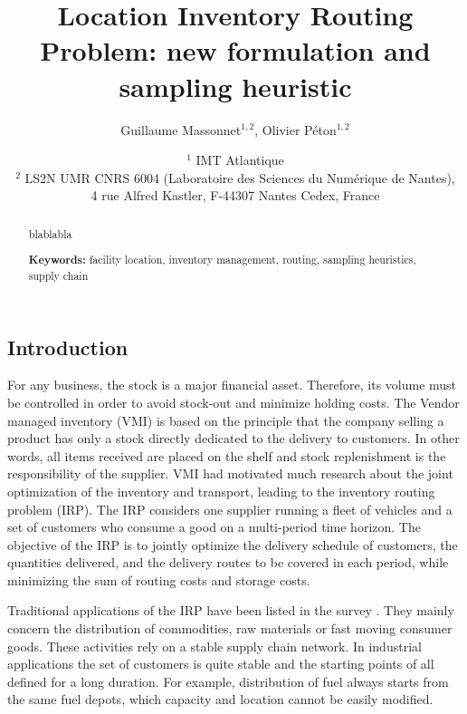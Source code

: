 \documentclass[a4paper,10pt]{article}
\title{Location Inventory Routing Problem: new formulation and sampling heuristic}
\author{Guillaume Massonnet$^{1,2}$, Olivier P\'eton$^{1,2}$}
\date{$^1$ IMT Atlantique\\ 
	$^2$ LS2N UMR CNRS 6004 (Laboratoire des Sciences du Numérique de Nantes), \\ 4 rue Alfred Kastler, F-44307 Nantes Cedex, France}
\begin{document}
	
\maketitle

\begin{abstract}
	blablabla
	
	
\textbf{Keywords:}	facility location, inventory management, routing, sampling heuristics, supply chain
	
\end{abstract}



\modulolinenumbers[5]
\linenumbers
\begin{linenumbers}


\section{Introduction}

For any business, the stock is a major financial asset. 
Therefore, its volume must be controlled in order to avoid stock-out and minimize holding costs. 
The Vendor managed inventory (VMI) is based on the principle that the company selling a product has only a stock directly dedicated to the delivery to customers. In other words, all items received are placed on the shelf and stock replenishment is the responsibility of the supplier. VMI had motivated much research about the joint optimization of the inventory and transport, leading to the inventory routing problem (IRP). The IRP considers one supplier running a fleet of vehicles and a set of customers who consume a good on a multi-period time horizon. The objective of the IRP is to jointly optimize the delivery schedule of customers, the quantities delivered, and the delivery routes to be covered in each period, while minimizing the sum of routing costs and storage costs.

Traditional applications of the IRP have been listed in the survey \cite{Coelho2014}. They mainly concern the distribution of commodities, raw materials or fast moving consumer goods. These activities rely on a stable supply chain network. 
In industrial applications the set of customers is quite stable and the starting points of all defined for a long duration.
For example, distribution of fuel always starts from the same fuel depots, which capacity and location cannot be easily modified. 


\end{linenumbers}
\end{document}
